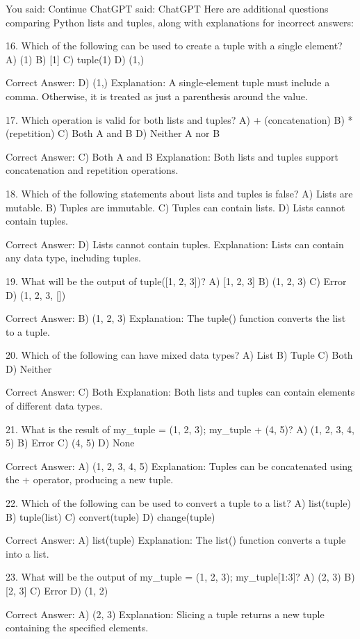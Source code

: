 You said:
Continue
ChatGPT said:
ChatGPT
Here are additional questions comparing Python lists and tuples, along with explanations for incorrect answers:

16. Which of the following can be used to create a tuple with a single element?
A) (1)
B) [1]
C) tuple(1)
D) (1,)

Correct Answer: D) (1,)
Explanation: A single-element tuple must include a comma. Otherwise, it is treated as just a parenthesis around the value.

17. Which operation is valid for both lists and tuples?
A) + (concatenation)
B) * (repetition)
C) Both A and B
D) Neither A nor B

Correct Answer: C) Both A and B
Explanation: Both lists and tuples support concatenation and repetition operations.

18. Which of the following statements about lists and tuples is false?
A) Lists are mutable.
B) Tuples are immutable.
C) Tuples can contain lists.
D) Lists cannot contain tuples.

Correct Answer: D) Lists cannot contain tuples.
Explanation: Lists can contain any data type, including tuples.

19. What will be the output of tuple([1, 2, 3])?
A) [1, 2, 3]
B) (1, 2, 3)
C) Error
D) (1, 2, 3, [])

Correct Answer: B) (1, 2, 3)
Explanation: The tuple() function converts the list to a tuple.

20. Which of the following can have mixed data types?
A) List
B) Tuple
C) Both
D) Neither

Correct Answer: C) Both
Explanation: Both lists and tuples can contain elements of different data types.

21. What is the result of my_tuple = (1, 2, 3); my_tuple + (4, 5)?
A) (1, 2, 3, 4, 5)
B) Error
C) (4, 5)
D) None

Correct Answer: A) (1, 2, 3, 4, 5)
Explanation: Tuples can be concatenated using the + operator, producing a new tuple.

22. Which of the following can be used to convert a tuple to a list?
A) list(tuple)
B) tuple(list)
C) convert(tuple)
D) change(tuple)

Correct Answer: A) list(tuple)
Explanation: The list() function converts a tuple into a list.

23. What will be the output of my_tuple = (1, 2, 3); my_tuple[1:3]?
A) (2, 3)
B) [2, 3]
C) Error
D) (1, 2)

Correct Answer: A) (2, 3)
Explanation: Slicing a tuple returns a new tuple containing the specified elements.


